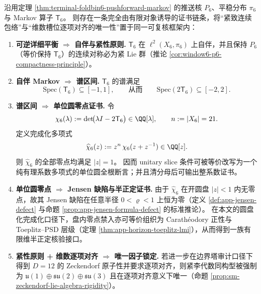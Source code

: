 \begin{theorem}\label{thm:window6-p6-toeplitz-certificate-chain}
沿用定理 \ref{thm:terminal-foldbin6-pushforward-markov} 的推送核 \(P_6\)、平稳分布 \(\pi_6\) 与 Markov 算子 \(\mathsf{T}_6\)。
则存在一条完全由有限对象诱导的证书链条，将“紧致连续包络”与“维数槽位逐项对齐的唯一性”置于同一可复核框架内：
\begin{enumerate}
  \item \textbf{可逆详细平衡 \(\Rightarrow\) 自伴与紧性原则.}
  \(\mathsf{T}_6\) 在 \(\ell^2(X_6,\pi_6)\) 上自伴，并且保持 \(P_6\)（等价保持 \(\mathsf{T}_6\)）的连续对称必为紧 Lie 群（推论 \ref{cor:window6-p6-compactness-principle}）。

  \item \textbf{自伴 Markov \(\Rightarrow\) 谱区间.}
  \(\mathsf{T}_6\) 的谱满足
  \[
  \mathrm{Spec}(\mathsf{T}_6)\subseteq[-1,1],
  \qquad\text{从而}\qquad
  \mathrm{Spec}(2\mathsf{T}_6)\subseteq[-2,2].
  \]

  \item \textbf{谱区间 \(\Rightarrow\) 单位圆零点证书.}
  令
  \[
  \chi_6(\lambda):=\det\!\bigl(\lambda I-2\mathsf{T}_6\bigr)\in\QQ[\lambda],
  \qquad n:=|X_6|=21.
  \]
  定义完成化多项式
  \[
  \widehat{\chi}_6(z):=z^{n}\,\chi_6(z+z^{-1})\in\QQ[z].
  \]
  则 \(\widehat{\chi}_6\) 的全部零点均满足 \(|z|=1\)。
  因而 unitary slice 条件可被等价改写为一个纯有理系数多项式的单位圆全根断言；并且清分母后可输出整系数证书。

  \item \textbf{单位圆零点 \(\Rightarrow\) Jensen 缺陷与半正定证书.}
  由于 \(\widehat{\chi}_6\) 在开圆盘 \(|z|<1\) 内无零点，故其 Jensen 缺陷在任意半径 \(0<\varrho<1\) 上恒为零（定义 \ref{def:app-jensen-defect} 与命题 \ref{prop:app-jensen-formula-defect} 的标准推论）。
  在本文的圆盘化完成化口径下，盘内零点禁入亦可等价组织为 Carath\'eodory 正性与 Toeplitz--PSD 层级（定理 \ref{thm:app-horizon-toeplitz-lmi}），从而得到一族有限维半正定核验接口。

  \item \textbf{紧性原则 + 维数逐项对齐 \(\Rightarrow\) 唯一因子锁定.}
  若进一步在边界塔审计口径下得到 \(D=12\) 的 Zeckendorf 原子性并要求逐项对齐，则紧李代数同构型被强制为
  \(
  \mathfrak u(1)\oplus\mathfrak{su}(2)\oplus\mathfrak{su}(3)
  \)
  且在逐项对齐意义下唯一（命题 \ref{prop:sm-zeckendorf-lie-algebra-rigidity}）。
\end{enumerate}
\end{theorem}

